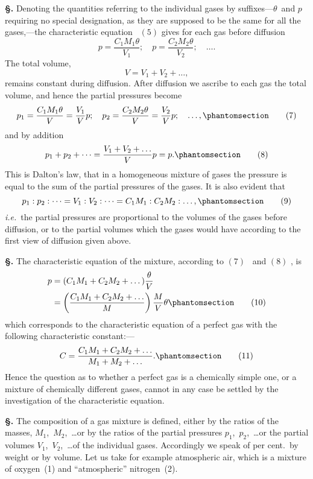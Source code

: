 \documentclass[12pt]{book}[2005/09/16]
\newcommand{\Chg}[2]{#2}
\newcommand{\Add}[1]{\Chg{}{#1}}
\newcommand{\Section}[1]{
  \medskip\par\textbf{§\;#1}
  \label{section:#1}
}
\newcommand{\Tag}[1]{%
  \phantomsection\label{eqn:#1}\tag*{\ensuremath{#1}}%
}
\newcommand{\Eq}[1]{%
  \hyperref[eqn:#1]{\ensuremath{#1}}%
}
\newcommand{\PageSep}[1]{\ignorespaces}
\newcommand{\ie}{\emph{i.e.}}
\begin{document}
\Section{18.} Denoting the quantities referring to the individual
gases by suffixes---$\theta$~and $p$ requiring no special designation,
as they are supposed to be the same for all the gases,---the
characteristic equation~\Eq{(5)} gives for each gas before
diffusion
\[
p = \frac{C_{1}M_{1} \theta}{V_{1}};\quad
p = \frac{C_{2}M_{2} \theta}{V_{2}};\quad \dots\Add{.}
\]
The total volume,
\[
V = V_{1} + V_{2} + \dots,
\]
remains constant during diffusion. After diffusion we ascribe
to each gas the total volume, and hence the partial
pressures become
\[
p_{1} = \frac{C_{1}M_{1} \theta}{V} = \frac{V_{1}}{V} p;\quad
p_{2} = \frac{C_{2}M_{2} \theta}{V} = \frac{V_{2}}{V} p;\quad \dots\Add{,}
\Tag{(7)}
\]
and by addition
\[
p_{1} + p_{2} + \dots = \frac{V_{1} + V_{2} + \dots}{V} p = p\Add{.}
\Tag{(8)}
\]
This is Dalton's law, that in a homogeneous mixture of
%
%
%
\PageSep{11}
gases the pressure is equal to the sum of the partial pressures
of the gases. It is also evident that
\[
p_{1} : p_{2} : \dots = V_{1} : V_{2} : \dots = C_{1}M_{1} : C_{2}M_{2} : \dots\Add{,}
\Tag{(9)}
\]
\ie\ the partial pressures are proportional to the volumes of
the gases before diffusion, or to the partial volumes which
the gases would have according to the first view of diffusion
given above.

\Section{19.} The characteristic equation of the mixture, according
%
%
to \Eq{(7)}~and \Eq{(8)}, is
\begin{align*}
p &= (C_{1}M_{1} + C_{2}M_{2} + \dots) \frac{\theta}{V} \\
  &= \left(\frac{C_{1}M_{1} + C_{2}M_{2} + \dots}{M}\right) \frac{M}{V} \theta
\Tag{(10)}
\end{align*}
which corresponds to the characteristic equation of a perfect
gas with the following characteristic constant:---
%
\[
C = \frac{C_{1}M_{1} + C_{2}M_{2} + \dots}{M_{1} + M_{2} + \dots}\Add{.}
\Tag{(11)}
\]
Hence the question as to whether a perfect gas is a
chemically simple one, or a mixture of chemically different
gases, cannot in any case be settled by the investigation of
the characteristic equation.

\Section{20.} The composition of a gas mixture is defined, either
%
by the ratios of the masses, $M_{1}$,~$M_{2}$,~\dots or by the ratios
of the partial pressures $p_{1}$,~$p_{2}$,~\dots or the partial volumes
$V_{1}$,~$V_{2}$,~\dots of the individual gases. Accordingly we
speak of per cent.\ by weight or by volume. Let us take
for example atmospheric air, which is a mixture of oxygen~(1)
and ``atmospheric'' nitrogen~(2).
\end{document}
